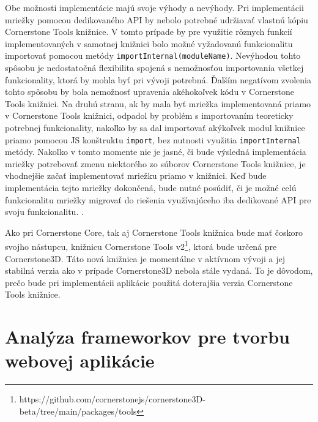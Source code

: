 Obe možnosti implementácie majú svoje výhody a nevýhody.
Pri implementácii mriežky pomocou dedikovaného API by nebolo potrebné udržiavať vlastnú kópiu Cornerstone Tools knižnice. V tomto prípade by pre využitie rôznych funkcií implementovaných v samotnej knižnici bolo možné vyžadovanú funkcionalitu importovať pomocou metódy \texttt{importInternal(moduleName)}. Nevýhodou tohto spôsobu je nedostatočná flexibilita spojená s nemožnosťou importovania všetkej funkcionality, ktorá by mohla byť pri vývoji potrebná. Ďalším negatívom zvolenia tohto spôsobu by bola nemožnosť upravenia akéhokoľvek kódu v Cornerstone Tools knižnici.
Na druhú stranu, ak by mala byť mriežka implementovaná priamo v Cornerstone Tools knižnici, odpadol by problém s importovaním teoreticky potrebnej funkcionality, nakoľko by sa dal importovať akýkoľvek modul knižnice priamo pomocou JS konštruktu \texttt{import}, bez nutnosti využitia \texttt{importInternal} metódy.
Nakoľko v tomto momente nie je jasné, či bude výsledná implementácia mriežky potrebovať zmenu niektorého zo súborov Cornerstone Tools knižnice, je vhodnejšie začať implementovať mriežku priamo v knižnici. Keď bude implementácia tejto mriežky dokončená, bude nutné posúdiť, či je možné celú funkcionalitu mriežky migrovať do riešenia využívajúceho iba dedikované API pre svoju funkcionalitu.  .

Ako pri Cornerstone Core, tak aj Cornerstone Tools knižnica bude mať čoskoro svojho nástupcu, knižnicu Cornerstone Tools v2\footnote{https://github.com/cornerstonejs/cornerstone3D-beta/tree/main/packages/tools}, ktorá bude určená pre Cornerstone3D. Táto nová knižnica je momentálne v aktívnom vývoji a jej stabilná verzia ako v prípade Cornerstone3D nebola stále vydaná. To je dôvodom, prečo bude pri implementácii aplikácie použitá doterajšia verzia Cornerstone Tools knižnice.

\section {Analýza frameworkov pre tvorbu webovej aplikácie}

